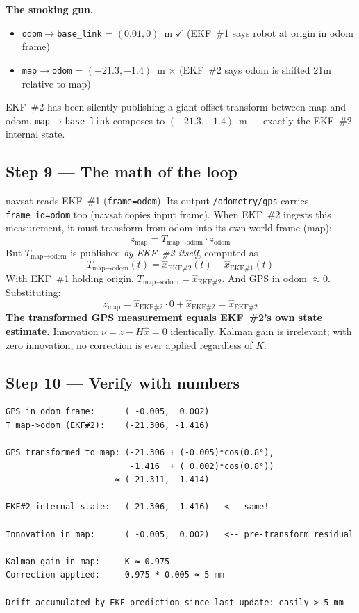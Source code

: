 \documentclass[11pt,a4paper]{article}
\newcommand{\good}[1]{\textcolor{good}{\textbf{#1}}}
\newcommand{\bad}[1]{\textcolor{bad}{\textbf{#1}}}
\begin{document}
\noindent
\textbf{The smoking gun.}
\begin{itemize}[noitemsep]
\item \texttt{odom$\to$base\_link} = $(0.01, 0)$~m \good{$\checkmark$} (EKF~\#1 says robot at origin in odom frame)
\item \texttt{map$\to$odom} = $(-21.3, -1.4)$~m \bad{$\times$} (EKF~\#2 says odom is shifted 21m relative to map)
\end{itemize}

\noindent
EKF~\#2 has been silently publishing a giant offset transform between map and odom.
\texttt{map$\to$base\_link} composes to $(-21.3, -1.4)$~m --- exactly the EKF~\#2 internal state.

\subsection{Step 9 --- The math of the loop}

navsat reads EKF~\#1 (\texttt{frame=odom}). Its output \texttt{/odometry/gps} carries
\texttt{frame\_id=odom} too (navsat copies input frame). When EKF~\#2 ingests this
measurement, it must transform from odom into its own world frame (map):
\[
z_{\text{map}} = T_{\text{map}\to\text{odom}} \cdot z_{\text{odom}}
\]
But $T_{\text{map}\to\text{odom}}$ is published \emph{by EKF~\#2 itself}, computed as
\[
T_{\text{map}\to\text{odom}}(t) = \hat{x}_{\text{EKF\#2}}(t) - \hat{x}_{\text{EKF\#1}}(t)
\]
With EKF~\#1 holding origin, $T_{\text{map}\to\text{odom}} = \hat{x}_{\text{EKF\#2}}$.
And GPS in odom $\approx 0$. Substituting:
\[
z_{\text{map}} = \hat{x}_{\text{EKF\#2}} \cdot 0 + \hat{x}_{\text{EKF\#2}} = \hat{x}_{\text{EKF\#2}}
\]
\textbf{The transformed GPS measurement equals EKF~\#2's own state estimate.} Innovation
$\nu = z - H\hat{x} = 0$ identically. Kalman gain is irrelevant; with zero innovation,
no correction is ever applied regardless of $K$.

\subsection{Step 10 --- Verify with numbers}

\begin{lstlisting}
GPS in odom frame:      ( -0.005,  0.002)
T_map->odom (EKF#2):    (-21.306, -1.416)

GPS transformed to map: (-21.306 + (-0.005)*cos(0.8°),
                         -1.416  + ( 0.002)*cos(0.8°))
                      ≈ (-21.311, -1.414)

EKF#2 internal state:   (-21.306, -1.416)   <-- same!

Innovation in map:      ( -0.005,  0.002)   <-- pre-transform residual

Kalman gain in map:     K ≈ 0.975
Correction applied:     0.975 * 0.005 ≈ 5 mm

Drift accumulated by EKF prediction since last update: easily > 5 mm
\end{lstlisting}
\end{document}
